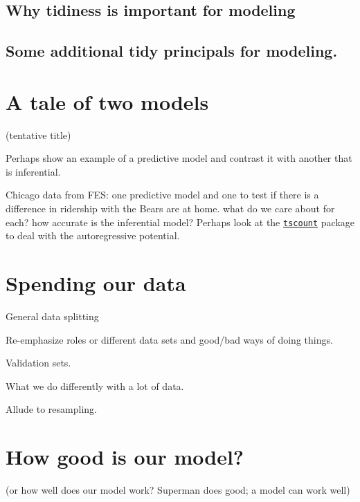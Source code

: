 \documentclass[11pt]{book}
\begin{document}
\hypertarget{why-tidiness-is-important-for-modeling}{%
\section{Why tidiness is important for modeling}\label{why-tidiness-is-important-for-modeling}}

\hypertarget{some-additional-tidy-principals-for-modeling.}{%
\section{Some additional tidy principals for modeling.}\label{some-additional-tidy-principals-for-modeling.}}

\hypertarget{two-models}{%
\chapter{A tale of two models}\label{two-models}}

(tentative title)

Perhaps show an example of a predictive model and contrast it with another that is inferential.

Chicago data from FES: one predictive model and one to test if there is a difference in ridership with the Bears are at home. what do we care about for each? how accurate is the inferential model? Perhaps look at the \href{https://www.jstatsoft.org/article/view/v082i05}{\texttt{tscount}} package to deal with the autoregressive potential.

\hypertarget{data-spending}{%
\chapter{Spending our data}\label{data-spending}}

General data splitting

Re-emphasize roles or different data sets and good/bad ways of doing things.

Validation sets.

What we do differently with a lot of data.

Allude to resampling.

\hypertarget{model-metrics}{%
\chapter{How good is our model?}\label{model-metrics}}

(or how well does our model work? Superman does good; a model can work well)
\end{document}
